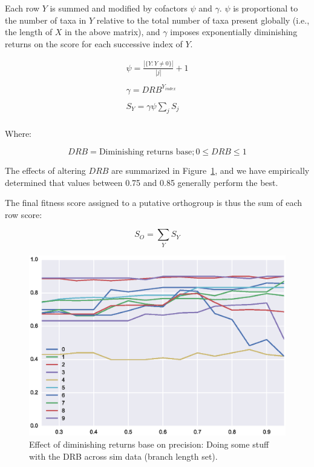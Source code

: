\documentclass[twocolumn]{bmcart}%
\begin{document}
Each row $Y$ is summed and modified by cofactors $\psi$ and $\gamma$. $\psi$ is proportional to the number of taxa in $Y$ relative to the total number of taxa present globally (i.e., the length of $X$ in the above matrix), and $\gamma$ imposes exponentially diminishing returns on the score for each successive index of $Y$.

\begin{gather*}
    \psi = \frac{|\{Y:Y \neq 0\}|}{|j|} + 1\\
    \\
    \gamma = DRB^{Y_{index}}\\
    \\
    S_Y = \gamma\psi\sum_{j} S_j\\
\end{gather*}

Where:

\[
DRB = \text{Diminishing returns base}; 0 \leq DRB \leq 1
\]

The effects of altering $DRB$ are summarized in Figure~\ref{fig:dim_rets}, and we have empirically determined that values between 0.75 and 0.85 generally perform the best.

The final fitness score assigned to a putative orthogroup is thus the sum of each row score:

\[
S_O = \sum_{Y} S_Y
\]

\begin{figure}[t]
  \begin{center}
  \includegraphics[height=0.22\textheight]{../figures/dim_ret_precision_line.eps}
\end{center}
\caption{Effect of diminishing returns base on precision: Doing some stuff with the DRB across sim data (branch length set).}
\label{fig:dim_rets}
\end{figure}
\end{document}
